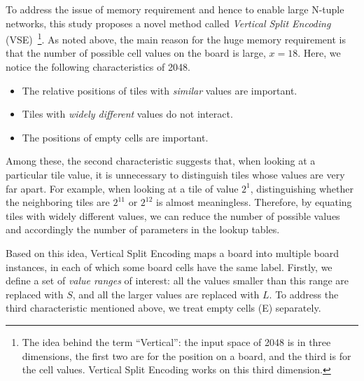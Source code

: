 To address the issue of memory requirement and hence to enable large N-tuple networks, this study proposes a novel method called \emph{Vertical Split Encoding} (VSE)~\footnote{The idea behind the term ``Vertical'': the input space of 2048 is in three dimensions, the first two are for the position on a board, and the third is for the cell values. Vertical Split Encoding works on this third dimension.}.
As noted above, the main reason for the huge memory requirement is that the number of possible cell values on the board is large, $x = 18$.
Here, we notice the following characteristics of 2048.
\begin{itemize}
 \item The relative positions of tiles with \emph{similar} values are important.
 \item Tiles with \emph{widely different} values do not interact.
 \item The positions of empty cells are important.
\end{itemize}
Among these, the second characteristic suggests that, when looking at a particular tile value, it is unnecessary to distinguish tiles whose values are very far apart. For example, when looking at a tile of value $2^1$, distinguishing whether the neighboring tiles are $2^{11}$ or $2^{12}$ is almost meaningless.
Therefore, by equating tiles with widely different values, we can reduce the number of possible values and accordingly the number of parameters in the lookup tables.

Based on this idea, Vertical Split Encoding maps a board into multiple board instances, in each of which some board cells have the same label.
Firstly, we define a set of \emph{value ranges} of interest: all the values smaller than this range are replaced with $S$, and all the larger values are replaced with $L$.
To address the third characteristic mentioned above, we treat empty cells (E) separately.

